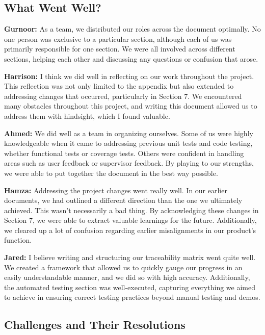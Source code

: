\documentclass[12pt, titlepage]{article}
\begin{document}
\begin{enumerate}
  \subsection{What Went Well?}
  
  \textbf{Gurnoor:} As a team, we distributed our roles across the document optimally. No one person was exclusive to a particular section, although each of us was primarily responsible for one section. We were all involved across different sections, helping each other and discussing any questions or confusion that arose.
  
  \textbf{Harrison:} I think we did well in reflecting on our work throughout the project. This reflection was not only limited to the appendix but also extended to addressing changes that occurred, particularly in Section 7. We encountered many obstacles throughout this project, and writing this document allowed us to address them with hindsight, which I found valuable.
  
  \textbf{Ahmed:} We did well as a team in organizing ourselves. Some of us were highly knowledgeable when it came to addressing previous unit tests and code testing, whether functional tests or coverage tests. Others were confident in handling areas such as user feedback or supervisor feedback. By playing to our strengths, we were able to put together the document in the best way possible.
  
  \textbf{Hamza:} Addressing the project changes went really well. In our earlier documents, we had outlined a different direction than the one we ultimately achieved. This wasn’t necessarily a bad thing. By acknowledging these changes in Section 7, we were able to extract valuable learnings for the future. Additionally, we cleared up a lot of confusion regarding earlier misalignments in our product's function.
  
  \textbf{Jared:} I believe writing and structuring our traceability matrix went quite well. We created a framework that allowed us to quickly gauge our progress in an easily understandable manner, and we did so with high accuracy. Additionally, the automated testing section was well-executed, capturing everything we aimed to achieve in ensuring correct testing practices beyond manual testing and demos.
  
  \subsection{Challenges and Their Resolutions}
  

\end{enumerate}
\end{document}
